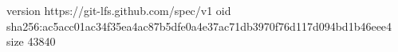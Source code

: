 version https://git-lfs.github.com/spec/v1
oid sha256:ac5acc01ac34f35ea4ac87b5dfe0a4e37ac71db3970f76d117d094bd1b46eee4
size 43840
